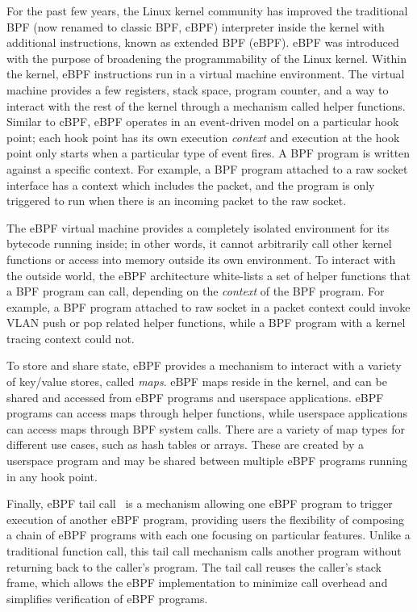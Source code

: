 \documentclass[10pt,numbers,reprint]{sigplanconf}
\begin{document}
For the past few years, the Linux kernel community has improved the traditional
BPF (now renamed to classic BPF, cBPF) interpreter inside the kernel with
additional instructions, known as extended BPF (eBPF). eBPF was introduced with
the purpose of broadening the programmability of the Linux kernel. Within the
kernel, eBPF instructions run in a virtual machine environment. The virtual
machine provides a few registers, stack space, program counter, and a way to
interact with the rest of the kernel through a mechanism called helper
functions.  Similar to cBPF, eBPF operates in an event-driven model on a
particular hook point; each hook point has its own execution {\em context} and
execution at the hook point only starts when a particular type of event fires.
A BPF program is written against a specific context. For example, a BPF program
attached to a raw socket interface has a context which includes the packet, and
the program is only triggered to run when there is an incoming packet to the
raw socket.

The eBPF virtual machine provides a completely isolated environment for its
bytecode running inside; in other words, it cannot arbitrarily call other
kernel functions or access into memory outside its own environment. To interact
with the outside world, the eBPF architecture white-lists a set of helper
functions that a BPF program can call, depending on the {\em context} of the
BPF program.  For example, a BPF program attached to raw socket in a packet
context could invoke VLAN push or pop related helper functions, while a BPF
program with a kernel tracing context could not. %

To store and share state, eBPF provides a mechanism to interact with a variety
of key/value stores, called \textit{maps}. eBPF maps reside in the kernel, and can be
shared and accessed from eBPF programs and userspace applications. eBPF
programs can access maps through helper functions, while userspace applications
can access maps through BPF system calls. There are a variety of map types for
different use cases, such as hash tables or arrays. These are created by a
userspace program and may be shared between multiple eBPF programs running in
any hook point.

Finally, eBPF tail call~\cite{tailcall} is a mechanism allowing one eBPF program to trigger execution of 
another eBPF program, providing users the flexibility of composing a chain of
eBPF programs with each one focusing on particular features.  Unlike a
traditional function call, this tail call mechanism calls another program
without returning back to the caller's program. The tail call reuses the
caller's stack frame, which allows the eBPF implementation to minimize call
overhead and simplifies verification of eBPF programs.
\end{document}

